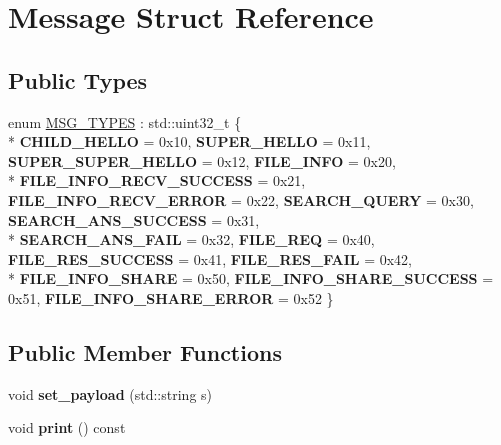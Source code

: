 \hypertarget{structMessage}{}\section{Message Struct Reference}
\label{structMessage}
\subsection*{Public Types}
\begin{DoxyCompactItemize}
\item 
enum \hyperlink{structMessage_a2cd191f475dd51cf44f57950e8862cd3}{M\+S\+G\+\_\+\+T\+Y\+P\+ES} \+: std\+::uint32\+\_\+t \{ \\*
{\bfseries C\+H\+I\+L\+D\+\_\+\+H\+E\+L\+LO} = 0x10, 
{\bfseries S\+U\+P\+E\+R\+\_\+\+H\+E\+L\+LO} = 0x11, 
{\bfseries S\+U\+P\+E\+R\+\_\+\+S\+U\+P\+E\+R\+\_\+\+H\+E\+L\+LO} = 0x12, 
{\bfseries F\+I\+L\+E\+\_\+\+I\+N\+FO} = 0x20, 
\\*
{\bfseries F\+I\+L\+E\+\_\+\+I\+N\+F\+O\+\_\+\+R\+E\+C\+V\+\_\+\+S\+U\+C\+C\+E\+SS} = 0x21, 
{\bfseries F\+I\+L\+E\+\_\+\+I\+N\+F\+O\+\_\+\+R\+E\+C\+V\+\_\+\+E\+R\+R\+OR} = 0x22, 
{\bfseries S\+E\+A\+R\+C\+H\+\_\+\+Q\+U\+E\+RY} = 0x30, 
{\bfseries S\+E\+A\+R\+C\+H\+\_\+\+A\+N\+S\+\_\+\+S\+U\+C\+C\+E\+SS} = 0x31, 
\\*
{\bfseries S\+E\+A\+R\+C\+H\+\_\+\+A\+N\+S\+\_\+\+F\+A\+IL} = 0x32, 
{\bfseries F\+I\+L\+E\+\_\+\+R\+EQ} = 0x40, 
{\bfseries F\+I\+L\+E\+\_\+\+R\+E\+S\+\_\+\+S\+U\+C\+C\+E\+SS} = 0x41, 
{\bfseries F\+I\+L\+E\+\_\+\+R\+E\+S\+\_\+\+F\+A\+IL} = 0x42, 
\\*
{\bfseries F\+I\+L\+E\+\_\+\+I\+N\+F\+O\+\_\+\+S\+H\+A\+RE} = 0x50, 
{\bfseries F\+I\+L\+E\+\_\+\+I\+N\+F\+O\+\_\+\+S\+H\+A\+R\+E\+\_\+\+S\+U\+C\+C\+E\+SS} = 0x51, 
{\bfseries F\+I\+L\+E\+\_\+\+I\+N\+F\+O\+\_\+\+S\+H\+A\+R\+E\+\_\+\+E\+R\+R\+OR} = 0x52
 \}
\end{DoxyCompactItemize}
\subsection*{Public Member Functions}
\begin{DoxyCompactItemize}
\item 
void {\bfseries set\+\_\+payload} (std\+::string s)\hypertarget{structMessage_a8c71bc14df10d1bc4a11c9912ec83e11}{}\label{structMessage_a8c71bc14df10d1bc4a11c9912ec83e11}

\item 
void {\bfseries print} () const \hypertarget{structMessage_a2967b7c13fd34ea7767b6e00076b3e76}{}\label{structMessage_a2967b7c13fd34ea7767b6e00076b3e76}

\end{DoxyCompactItemize}
